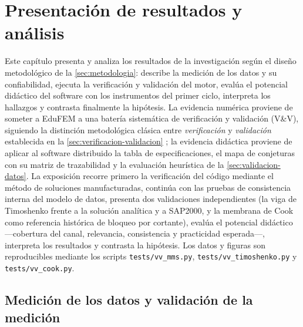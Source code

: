 \chapter{Presentación de resultados y análisis}
\label{cap:resultados}


Este capítulo presenta y analiza los resultados de la investigación según el diseño metodológico de la \autoref{sec:metodologia}: describe la medición de los datos y su confiabilidad, ejecuta la verificación y validación del motor, evalúa el potencial didáctico del software con los instrumentos del primer ciclo, interpreta los hallazgos y contrasta finalmente la hipótesis. La evidencia numérica proviene de someter a EduFEM a una batería sistemática de verificación y validación (V\&V), siguiendo la distinción metodológica clásica entre \emph{verificación} y \emph{validación} establecida en la \autoref{sec:verificacion-validacion} \autocite[pp.~13-14]{oberkampf2010vv}; la evidencia didáctica proviene de aplicar al software distribuido la tabla de especificaciones, el mapa de conjeturas con su matriz de trazabilidad y la evaluación heurística de la \autoref{sec:validacion-datos}. La exposición recorre primero la verificación del código mediante el método de soluciones manufacturadas, continúa con las pruebas de consistencia interna del modelo de datos, presenta dos validaciones independientes (la viga de Timoshenko frente a la solución analítica y a SAP2000, y la membrana de Cook como referencia histórica de bloqueo por cortante), evalúa el potencial didáctico —cobertura del canal, relevancia, consistencia y practicidad esperada—, interpreta los resultados y contrasta la hipótesis. Los datos y figuras son reproducibles mediante los scripts \texttt{tests/vv\_mms.py}, \texttt{tests/vv\_timoshenko.py} y \texttt{tests/vv\_cook.py}.

\section{Medición de los datos y validación de la medición}
\label{sec:medicion}

